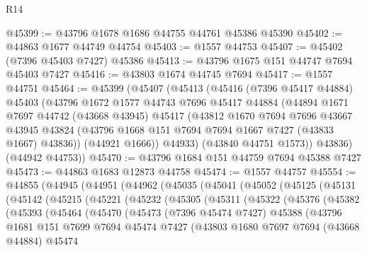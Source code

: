 \begin{lexlean}{R14}
\begin{coremodule}
@45399 := @43796 @1678 @1686 @44755 @44761 @45386 @45390
@45402 := @44863 @1677 @44749 @44754
@45403 := @1557 @44753
@45407 := @45402 (@7396 @45403 @7427) @45386
@45413 := @43796 @1675 @151 @44747 @7694 @45403 @7427
@45416 := @43803 @1674 @44745 @7694
@45417 := @1557 @44751
@45464 := @45399
    (@45407
      (@45413
        (@45416
          (@7396 @45417 @44884)
          @45403
          (@43796
            @1672
            @1577
            @44743
            @7696
            @45417
            @44884
            (@44894
              @1671
              @7697
              @44742
              (@43668 @43945)
              @45417
              (@43812
                @1670
                @7694
                @7696
                @43667
                @43945
                @43824
                (@43796 @1668 @151 @7694 @7694 @1667 @7427 (@43833 @1667) @43836))
              (@44921 @1666))
            @44933)
          (@43840 @44751 @1573))
        @43836)
      (@44942 @44753))
@45470 := @43796 @1684 @151 @44759 @7694 @45388 @7427
@45473 := @44863 @1683 @12873 @44758
@45474 := @1557 @44757
@45554 := @44855
    (@44945
      (@44951
        (@44962
          (@45035
            (@45041
              (@45052
                (@45125
                  (@45131
                    (@45142
                      (@45215
                        (@45221
                          (@45232
                            (@45305
                              (@45311
                                (@45322
                                  (@45376
                                    (@45382
                                      (@45393
                                        (@45464
                                          (@45470
                                            (@45473
                                              (@7396 @45474 @7427)
                                              @45388
                                              (@43796
                                                @1681
                                                @151
                                                @7699
                                                @7694
                                                @45474
                                                @7427
                                                (@43803
                                                  @1680
                                                  @7697
                                                  @7694
                                                  (@43668 @44884)
                                                  @45474

\end{coremodule}
\end{lexlean}
